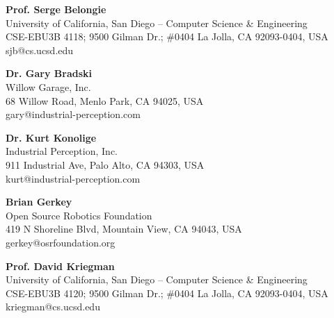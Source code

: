 

\textbf{Prof. Serge Belongie}\\
University of California, San Diego – Computer Science \& Engineering\\
CSE-EBU3B 4118; 9500 Gilman Dr.; \#0404 La Jolla, CA 92093-0404, USA\\
sjb@cs.ucsd.edu

\textbf{Dr. Gary Bradski}\\
Willow Garage, Inc. \\
68 Willow Road, Menlo Park, CA 94025, USA\\
gary@industrial-perception.com

\textbf{Dr. Kurt Konolige}\\
Industrial Perception, Inc. \\
911 Industrial Ave, Palo Alto, CA 94303, USA\\
kurt@industrial-perception.com

\textbf{Brian Gerkey}\\
Open Source Robotics Foundation\\
419 N Shoreline Blvd, Mountain View, CA 94043, USA\\
gerkey@osrfoundation.org

\textbf{Prof. David Kriegman}\\
University of California, San Diego – Computer Science \& Engineering\\
CSE-EBU3B 4120; 9500 Gilman Dr.; \#0404 La Jolla, CA 92093-0404, USA\\
kriegman@cs.ucsd.edu
